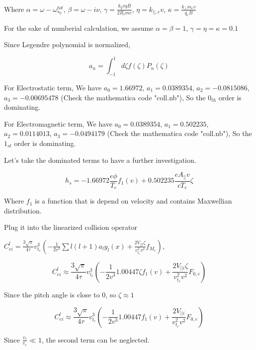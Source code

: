 Where $\alpha=\omega-\omega_{* e}^{t o t}$, $\beta=\omega - i\nu$, $\gamma=\frac{k_yvqB}{2R_c mc} $, $\eta=k_{||,e}v$, $\kappa = \frac{k_\perp m_e v}{q_eB}$

For the sake of numberial calculation, we assume $\alpha=\beta=1$, $\gamma=\eta=\kappa=0.1$

Since Legendre polynomial is normalized, 

\begin{equation}
    a_n=\int^{1}_{-1} d\zeta f(\zeta) P_n(\zeta)
\end{equation}

For Electrostatic term, We have $a_0=1.66972$, $a_1=0.0389354$, $a_2=-0.0815086$, $a_3=-0.00695478$ (Check the mathematica code "coll.nb"), So the $0_{th}$ order is dominating. 

For Electromagnetic term, We have $a_0=0.0389354$, $a_1=0.502235$, $a_2=0.0114013$, $a_3=-0.0494179$ (Check the mathematica code "coll.nb"), So the $1_{st}$ order is dominating. 

Let's take the dominated terms to have a further investigation. 

\begin{equation}
    h_s=-1.66972\frac{e\phi}{T_e} f_1(v)+0.502235\frac{eA_{||}v}{cT_e}\zeta
\end{equation}

Where $f_1$ is a function that is depend on velocity and contains Maxwellian distribution. 

Plug it into the linearized collision operator 

$C_{e i}^{l}=\frac{3 \sqrt{\pi}}{4 \tau} v_{t_{e}}^{3}\left(-\frac{1}{2 v^{3}} \sum l(l+1) a_{l} y_{l}(x)+\frac{2 V_{|| i} \zeta}{v_{t_{e}}^{2} v^{2}} f_{M_{e}}\right)$,

\begin{equation}
C_{e i}^{l}\approx
\frac{3 \sqrt{\pi}}{4 \tau} v_{t_{e}}^{3}\left(-\frac{1}{2 v^{3}} 1.00447 \zeta f_1(v)+\frac{2 V_{|| i} \zeta}{v_{t_{e}}^{2} v^{2}} F_{0,e}\right)
\end{equation}

Since the pitch angle is close to 0, so $\zeta \approx 1$

\begin{equation}
C_{e i}^{l}\approx
\frac{3 \sqrt{\pi}}{4 \tau} v_{t_{e}}^{3}\left(-\frac{1}{2 v^{3}} 1.00447 f_1(v)+\frac{2 V_{|| i} }{v_{t_{e}}^{2} v^{2}} F_{0,e}\right)
\end{equation}

Since $\frac{v_i}{v_e}\ll1$, the second term can be neglected. 

